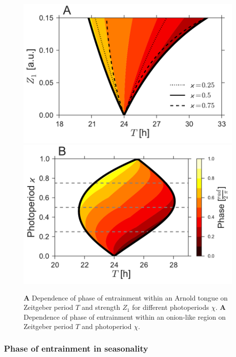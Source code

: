 \begin{figure}
\begin{center}
\includegraphics[width=0.49\linewidth]{figures/phase/fig1A.pdf}
\includegraphics[width=0.49\linewidth]{figures/phase/fig1B.pdf}
\end{center}
\caption{
  {\bf A} Dependence of phase of entrainment within an Arnold tongue
  on Zeitgeber period $T$ and strength $Z_1$ for different
  photoperiods $\chi$.
  {\bf A} Dependence of phase of entrainment within an onion-like
  region on Zeitgeber period $T$ and photoperiod $\chi$.
\label{fig::phase}
}
\end{figure}

\subsubsection{Phase of entrainment in seasonality}
